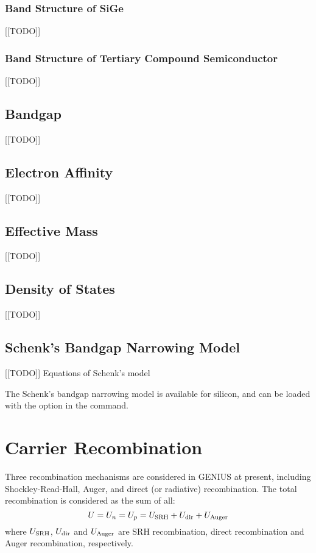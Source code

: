 \documentclass[oneside,12pt]{cgd_book}
\begin{document}
\subsubsection{Band Structure of SiGe}
[[TODO]]
\par
\subsubsection{Band Structure of Tertiary Compound Semiconductor}
[[TODO]]
\par
\subsection{Bandgap}[[TODO]]
\par
\par
\subsection{Electron Affinity}[[TODO]]
\par
\par
\subsection{Effective Mass}[[TODO]]
\par
\par
\subsection{Density of States}[[TODO]]
\par
\par
\subsection{Schenk's Bandgap Narrowing Model}
[[TODO]] Equations of Schenk's model
\par
The Schenk's bandgap narrowing model is available for silicon, and can be loaded with the option
 in the  command.
\par
\section{Carrier Recombination}
Three recombination mechanisms are considered in GENIUS at present, including Shockley-Read-Hall, Auger, and
      direct (or radiative) recombination. The total recombination is considered as the sum of all:
\begin{equation}
U = U_n = U_p = U_{\rm SRH} + U_{\rm dir} + U_{\rm Auger}
\end{equation}
where $U_{\rm SRH}$, $U_{\rm dir}$ and $U_{\rm Auger}$ are SRH recombination, direct recombination and Auger recombination,
      respectively.
\par
\end{document}
